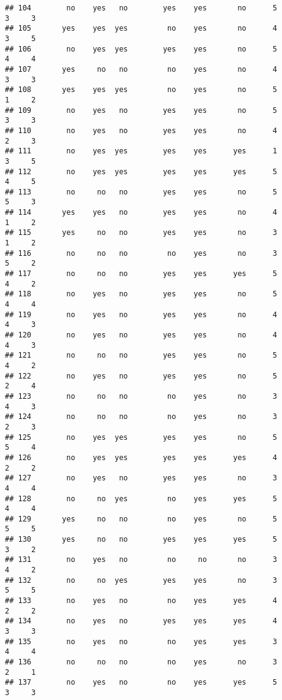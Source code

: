 \documentclass[]{article}
\begin{document}
\begin{verbatim}
## 104        no    yes   no        yes    yes       no      5        3     3
## 105       yes    yes  yes         no    yes       no      4        3     5
## 106        no    yes  yes        yes    yes       no      5        4     4
## 107       yes     no   no         no    yes       no      4        3     3
## 108       yes    yes  yes         no    yes       no      5        1     2
## 109        no    yes   no        yes    yes       no      5        3     3
## 110        no    yes   no        yes    yes       no      4        2     3
## 111        no    yes  yes        yes    yes      yes      1        3     5
## 112        no    yes  yes        yes    yes      yes      5        4     5
## 113        no     no   no        yes    yes       no      5        5     3
## 114       yes    yes   no        yes    yes       no      4        1     2
## 115       yes     no   no        yes    yes       no      3        1     2
## 116        no     no   no         no    yes       no      3        5     2
## 117        no     no   no        yes    yes      yes      5        4     2
## 118        no    yes   no        yes    yes       no      5        4     4
## 119        no    yes   no        yes    yes       no      4        4     3
## 120        no    yes   no        yes    yes       no      4        4     3
## 121        no     no   no        yes    yes       no      5        4     2
## 122        no    yes   no        yes    yes       no      5        2     4
## 123        no     no   no         no    yes       no      3        4     3
## 124        no     no   no         no    yes       no      3        2     3
## 125        no    yes  yes        yes    yes       no      5        5     4
## 126        no    yes  yes        yes    yes      yes      4        2     2
## 127        no    yes   no        yes    yes       no      3        4     4
## 128        no     no  yes         no    yes      yes      5        4     4
## 129       yes     no   no         no    yes       no      5        5     5
## 130       yes     no   no        yes    yes      yes      5        3     2
## 131        no    yes   no         no     no       no      3        4     2
## 132        no     no  yes        yes    yes       no      3        5     5
## 133        no    yes   no         no    yes      yes      4        2     2
## 134        no    yes   no        yes    yes      yes      4        3     3
## 135        no    yes   no         no    yes      yes      3        4     4
## 136        no     no   no         no    yes       no      3        2     1
## 137        no    yes   no         no    yes      yes      5        3     3

\end{verbatim}
\end{document}
